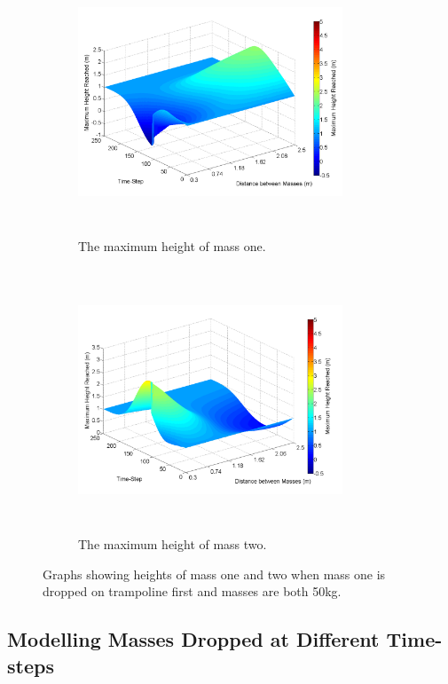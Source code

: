 \begin{figure}[H]
	\centering
    \begin{subfigure}{0.45\textwidth}
		\includegraphics[width=3.1in, height=3.1in]{m1_on_tramp_same_masses_m1.png}
    	\caption{The maximum height of mass one.}\label{fig:m1samem1}
    \end{subfigure}\hfill
	\begin{subfigure}{0.45\textwidth}
		\includegraphics[width=3.1in, height=3.1in]{m1_on_tramp_same_masses_m2.png}
    	\caption{The maximum height of mass two.}\label{fig:m1samem2}
    \end{subfigure}\hfill
    \caption{Graphs showing heights of mass one and two when mass one is dropped on trampoline first and masses are both 50kg.}\label{fig:msameon3d}
\end{figure}




\subsection{Modelling Masses Dropped at Different Time-steps}\label{res1}

